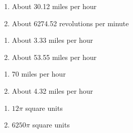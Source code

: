 \documentclass{ximera}
\begin{document}

\begin{multicols}{2}

\begin{enumerate}

\setcounter{enumi}{\value{HW}}

\item About 30.12 miles per hour
\item About 6274.52 revolutions per minute

\setcounter{HW}{\value{enumi}}

\end{enumerate}

\end{multicols}

\begin{multicols}{2}

\begin{enumerate}

\setcounter{enumi}{\value{HW}}

\item About 3.33 miles per hour
\item About 53.55 miles per hour

\setcounter{HW}{\value{enumi}}

\end{enumerate}

\end{multicols}

\begin{multicols}{2}

\begin{enumerate}

\setcounter{enumi}{\value{HW}}

\item 70 miles per hour
\item About 4.32 miles per hour

\setcounter{HW}{\value{enumi}}

\end{enumerate}

\end{multicols}

\begin{multicols}{2}

\begin{enumerate}

\setcounter{enumi}{\value{HW}}

\addtocounter{enumi}{1}

\item $12\pi$ square units
\item $6250\pi$ square units 

\setcounter{HW}{\value{enumi}}

\end{enumerate}

\end{multicols}
\end{document}
